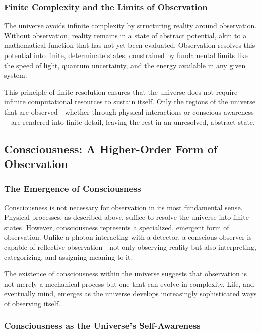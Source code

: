 \documentclass[12pt]{article}
\begin{document}
\subsubsection{Finite Complexity and the Limits of Observation}

The universe avoids infinite complexity by structuring reality around observation. Without observation, reality remains in a state of abstract potential, akin to a mathematical function that has not yet been evaluated. Observation resolves this potential into finite, determinate states, constrained by fundamental limits like the speed of light, quantum uncertainty, and the energy available in any given system.

This principle of finite resolution ensures that the universe does not require infinite computational resources to sustain itself. Only the regions of the universe that are observed—whether through physical interactions or conscious awareness—are rendered into finite detail, leaving the rest in an unresolved, abstract state.

\subsection{Consciousness: A Higher-Order Form of Observation}

\subsubsection{The Emergence of Consciousness}

Consciousness is not necessary for observation in its most fundamental sense. Physical processes, as described above, suffice to resolve the universe into finite states. However, consciousness represents a specialized, emergent form of observation. Unlike a photon interacting with a detector, a conscious observer is capable of reflective observation—not only observing reality but also interpreting, categorizing, and assigning meaning to it.

The existence of consciousness within the universe suggests that observation is not merely a mechanical process but one that can evolve in complexity. Life, and eventually mind, emerges as the universe develops increasingly sophisticated ways of observing itself.

\subsubsection{Consciousness as the Universe’s Self-Awareness}
\end{document}

